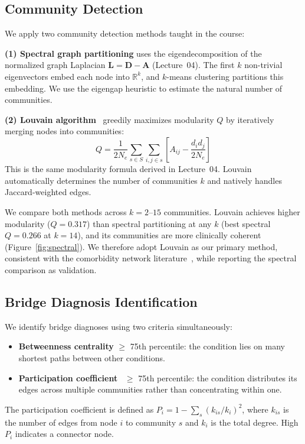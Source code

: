 \documentclass[10pt,twocolumn]{article}
\begin{document}
\subsection{Community Detection}

We apply two community detection methods taught in the course:

\textbf{(1) Spectral graph partitioning} uses the eigendecomposition of the normalized graph Laplacian $\mathbf{L} = \mathbf{D} - \mathbf{A}$ (Lecture~04).
The first $k$ non-trivial eigenvectors embed each node into $\mathbb{R}^k$, and $k$-means clustering partitions this embedding.
We use the eigengap heuristic to estimate the natural number of communities.

\textbf{(2) Louvain algorithm}~\cite{blondel2008} greedily maximizes modularity $Q$ by iteratively merging nodes into communities:
\[
Q = \frac{1}{2N_e}\sum_{s \in S}\sum_{i,j \in s}\left[A_{ij} - \frac{d_i d_j}{2N_e}\right]
\]
This is the same modularity formula derived in Lecture~04.
Louvain automatically determines the number of communities $k$ and natively handles Jaccard-weighted edges.

We compare both methods across $k = 2$--$15$ communities.
Louvain achieves higher modularity ($Q = 0.317$) than spectral partitioning at any $k$ (best spectral $Q = 0.266$ at $k = 14$), and its communities are more clinically coherent (Figure~\ref{fig:spectral}).
We therefore adopt Louvain as our primary method, consistent with the comorbidity network literature~\cite{hidalgo2009}, while reporting the spectral comparison as validation.

\subsection{Bridge Diagnosis Identification}

We identify bridge diagnoses using two criteria simultaneously:
\begin{itemize}
    \item \textbf{Betweenness centrality} $\geq$ 75th percentile: the condition lies on many shortest paths between other conditions.
    \item \textbf{Participation coefficient}~\cite{guimera2005} $\geq$ 75th percentile: the condition distributes its edges across multiple communities rather than concentrating within one.
\end{itemize}

The participation coefficient is defined as $P_i = 1 - \sum_s (k_{is}/k_i)^2$, where $k_{is}$ is the number of edges from node $i$ to community $s$ and $k_i$ is the total degree.
High $P_i$ indicates a connector node.
\end{document}
